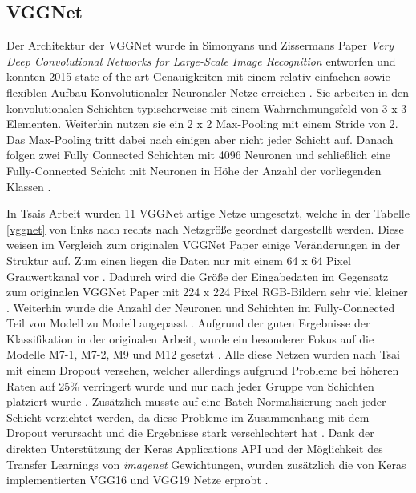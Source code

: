\documentclass[twoside,a4paper]{IEEEtran}
\begin{document}
\subsection{VGGNet}  %
Der Architektur der VGGNet wurde in Simonyans und Zissermans Paper \textit{Very Deep Convolutional Networks for Large-Scale Image Recognition} entworfen und konnten 2015 state-of-the-art Genauigkeiten mit einem relativ einfachen sowie flexiblen Aufbau Konvolutionaler Neuronaler Netze erreichen \cite[S.1]{simonyan2015deep}. Sie arbeiten in den konvolutionalen Schichten typischerweise mit einem Wahrnehmungsfeld von 3 x 3 Elementen. Weiterhin nutzen sie ein 2 x 2 Max-Pooling mit einem Stride von 2. Das Max-Pooling tritt dabei nach einigen aber nicht jeder Schicht auf. Danach folgen zwei Fully Connected Schichten mit 4096 Neuronen und schließlich eine Fully-Connected Schicht mit Neuronen in Höhe der Anzahl der vorliegenden Klassen \cite[S.2]{simonyan2015deep}.

In Tsais Arbeit wurden 11 VGGNet artige Netze umgesetzt, welche in der Tabelle \ref{vggnet} von links nach rechts nach Netzgröße geordnet dargestellt werden. Diese weisen im Vergleich zum originalen VGGNet Paper einige Veränderungen in der Struktur auf. Zum einen liegen die Daten nur mit einem 64 x 64 Pixel Grauwertkanal vor \cite[S.3]{RHC}. Dadurch wird die Größe der Eingabedaten im Gegensatz zum originalen VGGNet Paper mit 224 x 224 Pixel RGB-Bildern sehr viel kleiner \cite[S.2]{simonyan2015deep}. Weiterhin wurde die Anzahl der Neuronen und Schichten im Fully-Connected Teil von Modell zu Modell angepasst \cite[S.3]{RHC}. Aufgrund der guten Ergebnisse der Klassifikation in der originalen Arbeit, wurde ein besonderer Fokus auf die Modelle M7-1, M7-2, M9 und M12 gesetzt \cite[S.5]{RHC}. Alle diese Netzen wurden nach Tsai mit einem Dropout versehen, welcher allerdings aufgrund Probleme bei höheren Raten auf 25\% verringert wurde und nur nach jeder Gruppe von Schichten platziert wurde \cite[S.2]{RHC}. Zusätzlich musste auf eine Batch-Normalisierung nach jeder Schicht verzichtet werden, da diese Probleme im Zusammenhang mit dem Dropout verursacht und die Ergebnisse stark verschlechtert hat \cite[S.4]{RHC}. Dank der direkten Unterstützung der Keras Applications API und der Möglichkeit des Transfer Learnings von \textit{imagenet} Gewichtungen, wurden zusätzlich die von Keras implementierten VGG16 und VGG19 Netze erprobt \cite{vgg_keras}.
\end{document}
